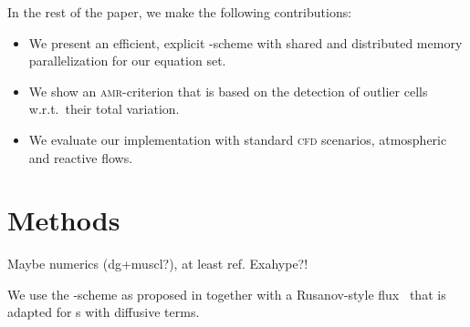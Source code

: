 \documentclass[runningheads]{llncs}
\begin{document}
In the rest of the paper, we make the following contributions:
\begin{itemize}
\item We present an efficient, explicit \aderdg{}-scheme with shared and distributed memory parallelization for our equation set.
\item We show an \textsc{amr}-criterion that is based on the detection of outlier cells w.r.t.\ their total variation.
\item We evaluate our implementation with standard \textsc{cfd} scenarios, atmospheric and reactive flows.
\end{itemize}

\section{Methods}
Maybe numerics (dg+muscl?), at least ref.
Exahype?! 

We use the \aderdg{}-scheme as proposed in \cite{dumbser2008unified} together with a Rusanov-style flux~\cite{gassner2008discontinuous,fambri2017space} that is adapted for \pde{}s with diffusive terms. 
\end{document}
